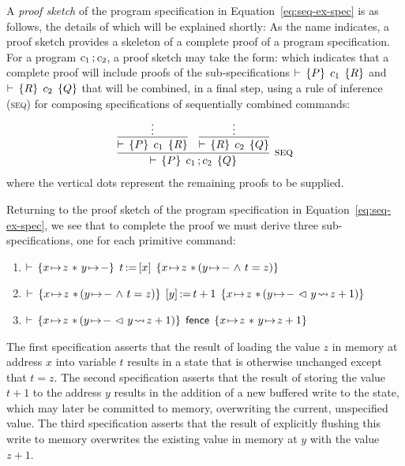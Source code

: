 \documentclass[11pt]{report}         %
\begin{document}
A \emph{proof sketch} of the program specification in Equation~\ref{eq:seq-ex-spec} is as follows, the details of which will be explained shortly:
As the name indicates, a proof sketch provides a skeleton of a complete proof of a program specification. For a program $c_1 \operatorname{;} c_2$, a proof sketch may take the form: 
 which indicates that a complete proof will include proofs of the sub-specifications $\vdash\,\left\lbrace P \right\rbrace\;c_1\;\left\lbrace R \right\rbrace$ and $\vdash\,\left\lbrace R \right\rbrace\;c_2\;\left\lbrace Q \right\rbrace$ that will be combined, in a final step, using a rule of inference (\textsc{seq}) for composing specifications of sequentially combined commands: 
\[ \infer[{\textsc{seq}}]{\triple{P}{c_1 \opseq c_2}{Q}}{\infer{\triple{P}{c_1}{R}}{\vdots} & \infer{\triple{R}{c_2}{Q}}{\vdots}}\] where the vertical dots represent the remaining proofs to be supplied. 

Returning to the proof sketch of the program specification in Equation~\ref{eq:seq-ex-spec}, we see that to complete the proof we must derive three sub-specifications, one for each primitive command: \begin{enumerate}
  \item $\triple{x \fpointsto z \fsep y \fpointsto -}{\cload{t}{x}}{x \fpointsto z \fsep (y \fpointsto - \conj t = z)}$
  \item $\triple{x \fpointsto z \fsep (y \fpointsto - \conj t = z)}{\cstore{y}{t+1}}{x \fpointsto z \fsep (y \fpointsto - \fseq y \fwriteu z+1)}$
  \item $\triple{x \fpointsto z \fsep (y \fpointsto - \fseq y \fwriteu z+1)}{\cfence}{x \fpointsto z \fsep y \fpointsto z+1}$
\end{enumerate}
The first specification asserts that the result of loading the value $z$ in memory at address $x$ into variable $t$ results in a state that is otherwise unchanged except that $t = z$. The second specification asserts that the result of storing the value $t+1$ to the address $y$ results in the addition of a new buffered write to the state, which may later be committed to memory, overwriting the current, unspecified value. The third specification asserts that the result of explicitly flushing this write to memory overwrites the existing value in memory at $y$ with the value $z+1$. 
\end{document}
